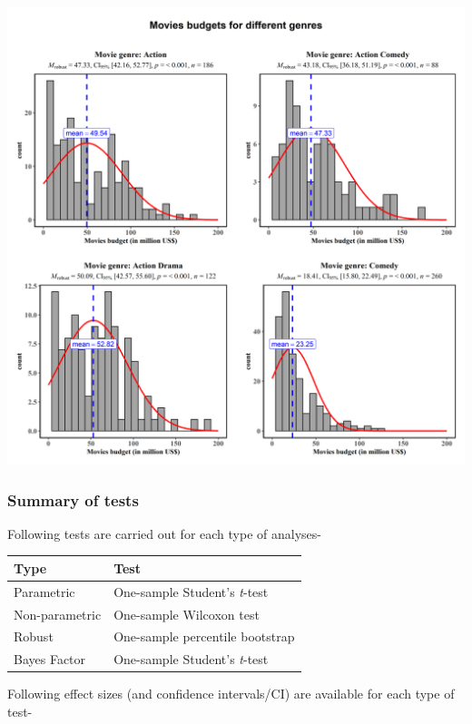 \documentclass[]{article}
\begin{document}
\includegraphics[width=1\linewidth]{./figures/paper-gghistostats4-1}

\hypertarget{summary-of-tests-5}{%
\subsubsection{Summary of tests}\label{summary-of-tests-5}}

Following tests are carried out for each type of analyses-

\begin{longtable}[]{@{}ll@{}}
\toprule
Type & Test\tabularnewline
\midrule
\endhead
Parametric & One-sample Student's \emph{t}-test\tabularnewline
Non-parametric & One-sample Wilcoxon test\tabularnewline
Robust & One-sample percentile bootstrap\tabularnewline
Bayes Factor & One-sample Student's \emph{t}-test\tabularnewline
\bottomrule
\end{longtable}

Following effect sizes (and confidence intervals/CI) are available for
each type of test-
\end{document}
